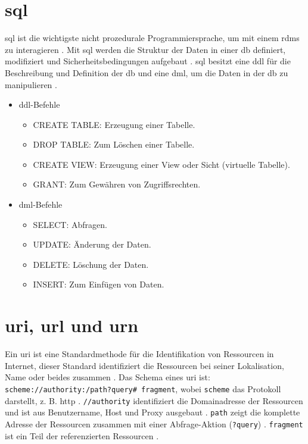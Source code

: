 \clearpage
\renewcommand{\cleardoublepage}{}
\renewcommand{\clearpage}{}

\chapter{\acs{sql}} \label{sec:sql}

\acf{sql} ist die wichtigste nicht prozedurale Programmiersprache, um mit einem \ac{rdms} zu interagieren \cite{sqlpost}. Mit \ac{sql} werden die Struktur der Daten in einer \ac{db} definiert, modifiziert und Sicherheitsbedingungen aufgebaut \cite{dbsql}. \ac{sql} besitzt eine \ac{ddl} für die Beschreibung und Definition der \ac{db} und eine \ac{dml}, um die Daten in der \ac{db} zu manipulieren \cite{sqlpost, dbsql}.

\begin{itemize}
	\item \ac{ddl}-Befehle
	\begin{itemize}
		\item CREATE TABLE: Erzeugung einer Tabelle.
		\item DROP TABLE: Zum Löschen einer Tabelle.
		\item CREATE VIEW: Erzeugung einer View oder Sicht (virtuelle Tabelle).
		\item GRANT: Zum Gewähren von Zugriffsrechten.
	\end{itemize}
	\item \ac{dml}-Befehle
	\begin{itemize}
		\item SELECT: Abfragen.
		\item UPDATE: Änderung der Daten.
		\item DELETE: Löschung der Daten.
		\item INSERT: Zum Einfügen von Daten.
	\end{itemize}
\end{itemize}

\chapter{\acs{uri}, \acs{url} und \acs{urn}} \label{sec:uri}

Ein \acf{uri} ist eine Standardmethode für die Identifikation von Ressourcen in Internet, dieser Standard identifiziert die Ressourcen bei seiner Lokalisation, Name oder beides zusammen \cite{uribibdiff}. Das Schema eines \ac{uri} ist: \texttt{scheme://authority:/path?query\# fragment}, wobei \texttt{scheme} das Protokoll darstellt, z. B. \glqq http\grqq{} \cite{uribibdiff, uribibdiff2}. \texttt{//authority} identifiziert die Domainadresse der Ressourcen und ist aus Benutzername, Host und Proxy ausgebaut \cite{uribibdiff, uribibdiff3}. \texttt{path} zeigt die komplette Adresse der Ressourcen zusammen mit einer Abfrage-Aktion (\texttt{?query}) \cite{uribibdiff2}. \texttt{fragment} ist ein Teil der referenzierten Ressourcen \cite{uribibdiff}.

